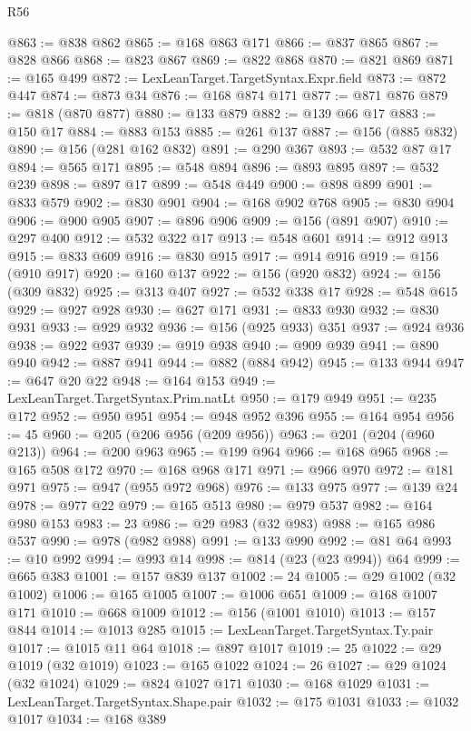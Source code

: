 \begin{lexlean}{R56}
\begin{coremodule}
@863 := @838 @862
@865 := @168 @863 @171
@866 := @837 @865
@867 := @828 @866
@868 := @823 @867
@869 := @822 @868
@870 := @821 @869
@871 := @165 @499
@872 := LexLeanTarget.TargetSyntax.Expr.field
@873 := @872 @447
@874 := @873 @34
@876 := @168 @874 @171
@877 := @871 @876
@879 := @818 (@870 @877)
@880 := @133 @879
@882 := @139 @66 @17
@883 := @150 @17
@884 := @883 @153
@885 := @261 @137
@887 := @156 (@885 @832)
@890 := @156 (@281 @162 @832)
@891 := @290 @367
@893 := @532 @87 @17
@894 := @565 @171
@895 := @548 @894
@896 := @893 @895
@897 := @532 @239
@898 := @897 @17
@899 := @548 @449
@900 := @898 @899
@901 := @833 @579
@902 := @830 @901
@904 := @168 @902 @768
@905 := @830 @904
@906 := @900 @905
@907 := @896 @906
@909 := @156 (@891 @907)
@910 := @297 @400
@912 := @532 @322 @17
@913 := @548 @601
@914 := @912 @913
@915 := @833 @609
@916 := @830 @915
@917 := @914 @916
@919 := @156 (@910 @917)
@920 := @160 @137
@922 := @156 (@920 @832)
@924 := @156 (@309 @832)
@925 := @313 @407
@927 := @532 @338 @17
@928 := @548 @615
@929 := @927 @928
@930 := @627 @171
@931 := @833 @930
@932 := @830 @931
@933 := @929 @932
@936 := @156 (@925 @933) @351
@937 := @924 @936
@938 := @922 @937
@939 := @919 @938
@940 := @909 @939
@941 := @890 @940
@942 := @887 @941
@944 := @882 (@884 @942)
@945 := @133 @944
@947 := @647 @20 @22
@948 := @164 @153
@949 := LexLeanTarget.TargetSyntax.Prim.natLt
@950 := @179 @949
@951 := @235 @172
@952 := @950 @951
@954 := @948 @952 @396
@955 := @164 @954
@956 := 45
@960 := @205 (@206 @956 (@209 @956))
@963 := @201 (@204 (@960 @213))
@964 := @200 @963
@965 := @199 @964
@966 := @168 @965
@968 := @165 @508 @172
@970 := @168 @968 @171
@971 := @966 @970
@972 := @181 @971
@975 := @947 (@955 @972 @968)
@976 := @133 @975
@977 := @139 @24
@978 := @977 @22
@979 := @165 @513
@980 := @979 @537
@982 := @164 @980 @153
@983 := 23
@986 := @29 @983 (@32 @983)
@988 := @165 @986 @537
@990 := @978 (@982 @988)
@991 := @133 @990
@992 := @81 @64
@993 := @10 @992
@994 := @993 @14
@998 := @814 (@23 (@23 @994)) @64
@999 := @665 @383
@1001 := @157 @839 @137
@1002 := 24
@1005 := @29 @1002 (@32 @1002)
@1006 := @165 @1005
@1007 := @1006 @651
@1009 := @168 @1007 @171
@1010 := @668 @1009
@1012 := @156 (@1001 @1010)
@1013 := @157 @844
@1014 := @1013 @285
@1015 := LexLeanTarget.TargetSyntax.Ty.pair
@1017 := @1015 @11 @64
@1018 := @897 @1017
@1019 := 25
@1022 := @29 @1019 (@32 @1019)
@1023 := @165 @1022
@1024 := 26
@1027 := @29 @1024 (@32 @1024)
@1029 := @824 @1027 @171
@1030 := @168 @1029
@1031 := LexLeanTarget.TargetSyntax.Shape.pair
@1032 := @175 @1031
@1033 := @1032 @1017
@1034 := @168 @389

\end{coremodule}
\end{lexlean}
